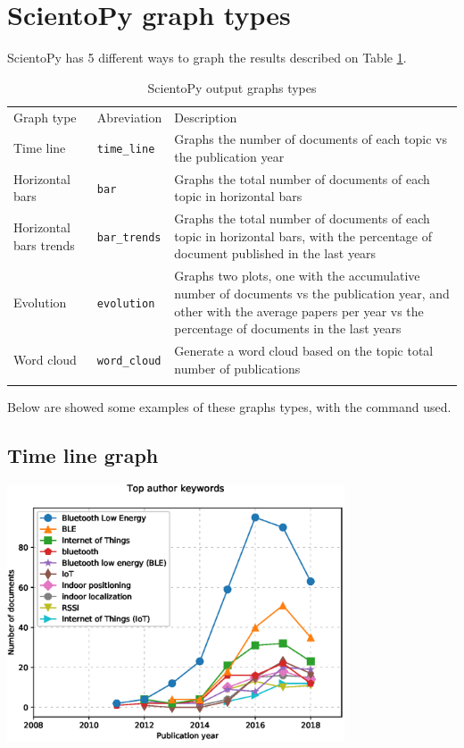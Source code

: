 \documentclass[10pt,letterpaper]{article}
\begin{document}
\newpage
\section{ScientoPy graph types}

ScientoPy has 5 different ways to graph the results described on Table \ref{table_graph_types}.

\begin{table}[!h]
	\centering
	\caption{ScientoPy output graphs types}
	\label{table_graph_types}

	\renewcommand{\arraystretch}{1.5}
	\begin{tabular}{ p{4cm} p{3cm} p{10cm}}
	\hline\noalign{\smallskip}
	Graph type     &  Abreviation & Description                             \\
	\noalign{\smallskip}\hline\noalign{\smallskip}                                                                         
	Time line      & \verb|time_line| & Graphs the number of documents of each topic vs the publication year \\
	Horizontal bars  & \verb|bar| & Graphs the total number of documents of each topic in horizontal bars \\
	Horizontal bars trends  & \verb|bar_trends| & Graphs the total number of documents of each topic in horizontal bars, with the percentage of document published in the last years \\
	Evolution     & \verb|evolution| & Graphs two plots, one with the accumulative number of documents vs the publication year, and other with the average papers per year vs the percentage of documents in the last years\\
	Word cloud     & \verb|word_cloud| & Generate a word cloud based on the topic total number of publications \\
	\noalign{\smallskip}\hline
	\end{tabular}
\end{table}

Below are showed some examples of these graphs types, with the command used.

\subsection{Time line graph}
\begin{center}
	\includegraphics[width=0.75\textwidth]{./figures/graph_time_line.eps}
\end{center}
\end{document}
